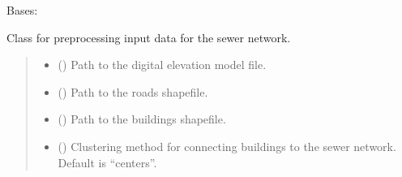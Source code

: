 \documentclass[letterpaper,10pt,english]{sphinxmanual}
\begin{document}
\begin{fulllineitems}
\label{\detokenize{pysewer:pysewer.preprocessing.ModelDomain}}
\pysigstartsignatures
{}
\pysigstopsignatures
\sphinxAtStartPar
Bases: 

\sphinxAtStartPar
Class for preprocessing input data for the sewer network.
\begin{quote}\begin{description}
\begin{itemize}
\item {} 
\sphinxAtStartPar
{} () \textendash{} Path to the digital elevation model file.

\item {} 
\sphinxAtStartPar
{} () \textendash{} Path to the roads shapefile.

\item {} 
\sphinxAtStartPar
{} () \textendash{} Path to the buildings shapefile.

\item {} 
\sphinxAtStartPar
{} (\sphinxstyleliteralemphasis{\sphinxupquote{, }}) \textendash{} Clustering method for connecting buildings to the sewer network. Default is “centers”.


\end{itemize}
\end{description}
\end{quote}
\end{fulllineitems}
\end{document}
